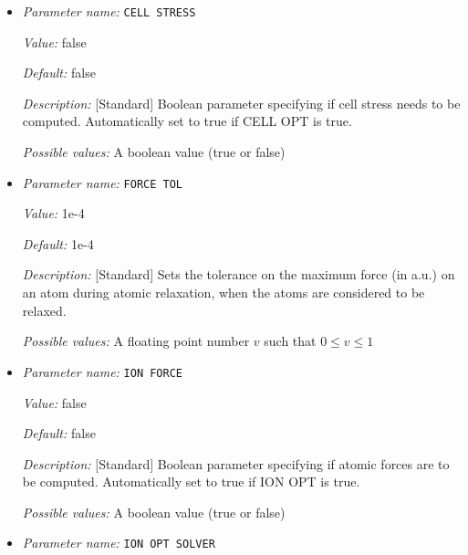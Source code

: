 \begin{itemize}
{\it Default:} LBFGS


{\it Description:} [Standard] Method for Cell relaxation solver. LBFGS is the default


{\it Possible values:} Any one of BFGS, LBFGS, CGPRP
\item {\it Parameter name:} {\tt CELL STRESS}
\label{parameters:Geometry/Optimization/CELL STRESS}
\label{parameters:Geometry/Optimization/CELL_20STRESS}


{\it Value:} false


{\it Default:} false


{\it Description:} [Standard] Boolean parameter specifying if cell stress needs to be computed. Automatically set to true if CELL OPT is true.


{\it Possible values:} A boolean value (true or false)
\item {\it Parameter name:} {\tt FORCE TOL}
\label{parameters:Geometry/Optimization/FORCE TOL}
\label{parameters:Geometry/Optimization/FORCE_20TOL}


{\it Value:} 1e-4


{\it Default:} 1e-4


{\it Description:} [Standard] Sets the tolerance on the maximum force (in a.u.) on an atom during atomic relaxation, when the atoms are considered to be relaxed.


{\it Possible values:} A floating point number $v$ such that $0 \leq v \leq 1$
\item {\it Parameter name:} {\tt ION FORCE}
\label{parameters:Geometry/Optimization/ION FORCE}
\label{parameters:Geometry/Optimization/ION_20FORCE}


{\it Value:} false


{\it Default:} false


{\it Description:} [Standard] Boolean parameter specifying if atomic forces are to be computed. Automatically set to true if ION OPT is true.


{\it Possible values:} A boolean value (true or false)
\item {\it Parameter name:} {\tt ION OPT SOLVER}
\label{parameters:Geometry/Optimization/ION OPT SOLVER}
\label{parameters:Geometry/Optimization/ION_20OPT_20SOLVER}



\end{itemize}
